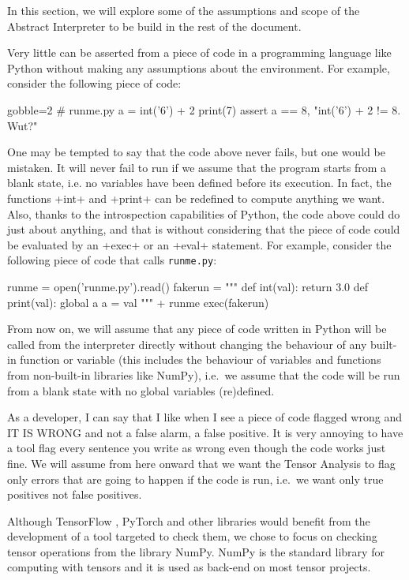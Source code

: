 In this section, we will explore some of the assumptions and scope of the Abstract
Interpreter to be build in the rest of the document.

Very little can be asserted from a piece of code in a programming language like Python
without making any assumptions about the environment. For example, consider the following
piece of code:

\begin{pythoncode*}{gobble=2}
  # runme.py
  a = int('6') + 2
  print(7)
  assert a == 8, "int('6') + 2 != 8. Wut?"
\end{pythoncode*}

One may be tempted to say that the code above never fails, but one would be mistaken.  It
will never fail to run if we assume that the program starts from a blank state, i.e. no
variables have been defined before its execution. In fact, the functions \pycode+int+ and
\pycode+print+ can be redefined to compute anything we want. Also, thanks to the
introspection capabilities of Python, the code above could do just about anything, and
that is without considering that the piece of code could be evaluated by an \pycode+exec+
or an \pycode+eval+ statement. For example, consider the following piece of code that
calls \texttt{runme.py}:

\begin{pythoncode}
  runme = open('runme.py').read()
  fakerun = """
  def int(val):
    return 3.0
  def print(val):
    global a
    a = val
  """ + runme
  exec(fakerun)
\end{pythoncode}

From now on, we will assume that any piece of code written in Python will be called from
the interpreter directly without changing the behaviour of any built-in function or
variable (this includes the behaviour of variables and functions from non-built-in
libraries like NumPy), i.e.~we assume that the code will be run from a blank state with no
global variables (re)defined.

As a developer, I can say that I like when I see a piece of code flagged wrong and IT IS
WRONG and not a false alarm, a false positive. It is very annoying to have a tool flag
every sentence you write as wrong even though the code works just fine. We will assume
from here onward that we want the Tensor Analysis to flag only errors that are going to
happen if the code is run, i.e.~we want only true positives not false positives.

Although TensorFlow \autocite{abadi_tensorflow_2016}, PyTorch
\autocite{paszke2017pytorch} and other libraries would benefit from the development of a
tool targeted to check them, we chose to focus on checking tensor operations from the
library NumPy. NumPy is the standard library for computing with tensors and it is used as
back-end on most tensor projects.

